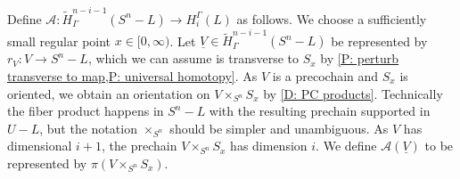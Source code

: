 \documentclass[12pt]{article}
\theoremstyle{plain}
\theoremstyle{definition}
\theoremstyle{remark}
\newcommand{\uV}{\underline{V}}
\newcommand{\td}[1]{\tilde{#1}}
\newcommand{\mc}[1]{\mathcal{#1}}
\begin{document}
\begin{comment}
Recall that we assume the components $L_i$ of $L$ have pairwise disjoint tubular neighborhoods $U_i$.
We identify these neighborhoods with normal bundles that we may further assume have been given smooth Riemannian bundle metrics.
This allows us to identify sphere bundles $S_a$ and the disk bundles $D_a$ consisting respectively of the elements of length $a$ or $\leq a$ in each Euclidean fiber.
Identifying the normal bundles with $U_i$, we think of the $S_a$ as smooth $n-1$ dimensional submanifolds of $S^n$ and of the $D_a$ as smooth $n$-dimensional submanifolds with boundary.
We can take $D_a$ to be oriented consistently with $S^n$ and let $S_a$ have the boundary orientation.

We next construct a locally collapsing map near $L$.
Let $\eta \colon [0,\infty) \to [0,\infty)$ be a smooth map that
\begin{itemize}
\item $\eta([0,1]) = 0$,
\item $\eta$ is strictly increasing on $[1,2]$, and
\item $\eta(x)=x$ for $x \geq 2$.
\end{itemize}
We then define $\rho \colon S^n \to S^n$ such that
\begin{itemize}
\item $\rho(x) = x$ if $x \in S^n - (\sqcup U_i)$,x
\item $\rho(x) = \eta(d(x))x$ if $x \in \sqcup U_i$, where $d(x)$ is the distance from the origin in the fiber of the bundle $U_i$ containing $x$, and $\eta(d(x))x$ is similarly the scalar multiplication in the fiber.
\end{itemize}
By construction, $\rho$ is the identity map outside of $\sqcup U_i$, it is a diffeomorphism from $S^n-D_1$ onto $S^n-L$, and it retracts $D_1$ onto $L$ by the bundle projection.
\end{comment}


Define $\mc A \colon \td H^{n-i-1}_\Gamma(S^n-L) \to H_i^\Gamma(L)$ as follows.
We choose a sufficiently small regular point $x \in [0,\infty)$.
Let $\uV \in \td H^{n-i-1}_\Gamma(S^n-L)$ be represented by $r_V \colon V \to S^n - L$, which we can assume is transverse to $S_x$ by \cref{P: perturb transverse to map,P: universal homotopy}.
As $V$ is a precochain and $S_x$ is oriented, we obtain an orientation on $V \times_{S^n} S_x$ by \cref{D: PC products}.
Technically the fiber product happens in $S^n-L$ with the resulting prechain supported in $U-L$, but the notation $\times_{S^n}$ should be simpler and unambiguous.
As $V$ has dimensional $i+1$, the prechain $V \times_{S^n} S_x$ has dimension $i$.
We define $\mc A(\uV)$ to be represented by $\pi(V \times_{S^n} S_x)$.
\end{document}
